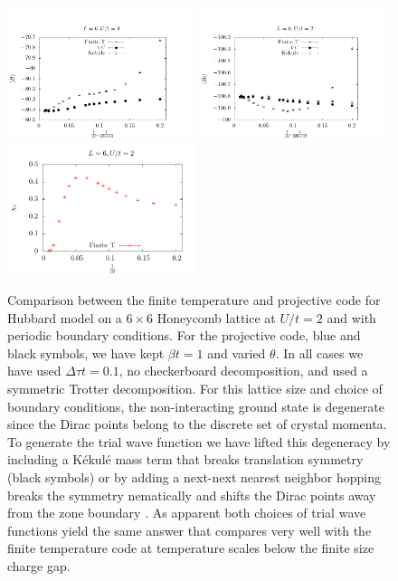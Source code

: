 \begin{figure}
\center
\includegraphics[width=0.49\textwidth]{Figures/Projector/Proj_ener.pdf}
\includegraphics[width=0.49\textwidth]{Figures/Projector/Proj_kin.pdf} \\
\includegraphics[width=0.49\textwidth]{Figures/Projector/Proj_chi.pdf}

	\caption{Comparison between the finite temperature and projective code for     Hubbard model on a $6 \times 6 $  Honeycomb lattice at $U/t=2$ and with periodic boundary conditions.   For the projective code,  blue and black symbols,  we have kept $\beta t = 1$ and  varied $\theta$. In all cases   we have used  $\Delta \tau t = 0.1$, no checkerboard decomposition,  and used a symmetric Trotter decomposition.  For this lattice size and choice of boundary conditions, the non-interacting ground state is degenerate since the Dirac   points  belong to the discrete set  of crystal momenta.  To generate the trial wave function we  have lifted this degeneracy by including a K\'ekul\' e mass term  \cite{Lang13} that breaks translation symmetry  (black symbols)  or by adding a  next-next nearest neighbor hopping  breaks the symmetry nematically  and shifts the Dirac points away from the zone boundary  \cite{Ixert14}. As apparent both choices of  trial wave functions yield the same answer  that compares very well with the finite temperature code at temperature scales below the finite size charge gap.   }
	\label{PQMC.fig}
\end{figure}

